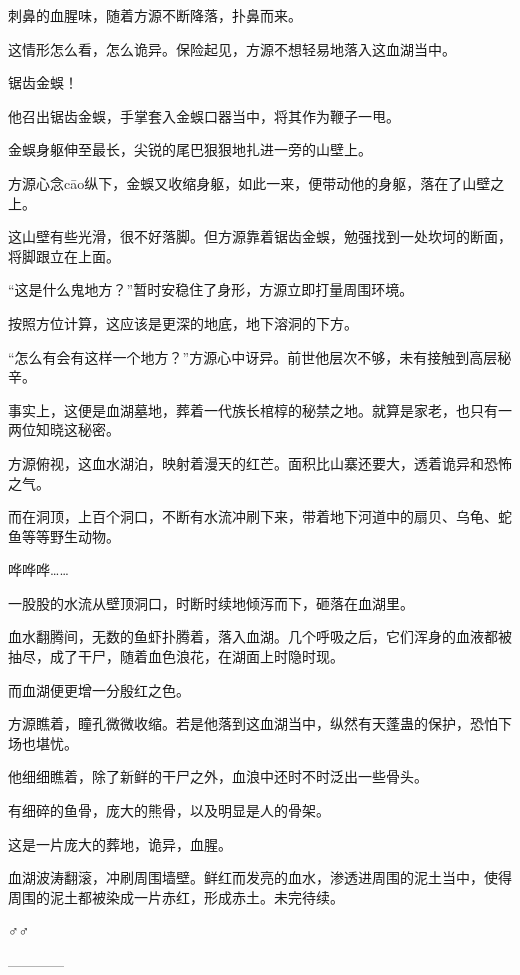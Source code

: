 \begin{this_body}
刺鼻的血腥味，随着方源不断降落，扑鼻而来。

这情形怎么看，怎么诡异。保险起见，方源不想轻易地落入这血湖当中。

锯齿金蜈！

他召出锯齿金蜈，手掌套入金蜈口器当中，将其作为鞭子一甩。

金蜈身躯伸至最长，尖锐的尾巴狠狠地扎进一旁的山壁上。

方源心念cāo纵下，金蜈又收缩身躯，如此一来，便带动他的身躯，落在了山壁之上。

这山壁有些光滑，很不好落脚。但方源靠着锯齿金蜈，勉强找到一处坎坷的断面，将脚跟立在上面。

“这是什么鬼地方？”暂时安稳住了身形，方源立即打量周围环境。

按照方位计算，这应该是更深的地底，地下溶洞的下方。

“怎么有会有这样一个地方？”方源心中讶异。前世他层次不够，未有接触到高层秘辛。

事实上，这便是血湖墓地，葬着一代族长棺椁的秘禁之地。就算是家老，也只有一两位知晓这秘密。

方源俯视，这血水湖泊，映射着漫天的红芒。面积比山寨还要大，透着诡异和恐怖之气。

而在洞顶，上百个洞口，不断有水流冲刷下来，带着地下河道中的扇贝、乌龟、蛇鱼等等野生动物。

哗哗哗……

一股股的水流从壁顶洞口，时断时续地倾泻而下，砸落在血湖里。

血水翻腾间，无数的鱼虾扑腾着，落入血湖。几个呼吸之后，它们浑身的血液都被抽尽，成了干尸，随着血色浪花，在湖面上时隐时现。

而血湖便更增一分殷红之色。

方源瞧着，瞳孔微微收缩。若是他落到这血湖当中，纵然有天蓬蛊的保护，恐怕下场也堪忧。

他细细瞧着，除了新鲜的干尸之外，血浪中还时不时泛出一些骨头。

有细碎的鱼骨，庞大的熊骨，以及明显是人的骨架。

这是一片庞大的葬地，诡异，血腥。

血湖波涛翻滚，冲刷周围墙壁。鲜红而发亮的血水，渗透进周围的泥土当中，使得周围的泥土都被染成一片赤红，形成赤土。未完待续。

♂♂

------------

\end{this_body}

